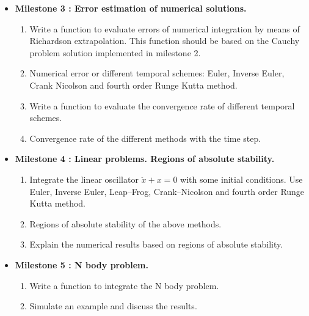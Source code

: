 \documentclass[12pt, a4paper]{article}
\begin{document}
\begin{itemize}
\begin{enumerate}
\end{enumerate} 



\item {\bf Milestone 3 : Error estimation of numerical solutions.} 


\begin{enumerate}

\item Write a function to evaluate errors of numerical integration by means of Richardson 
extrapolation. 
This function should be based on the Cauchy problem solution implemented in milestone 2. 
\item Numerical error or different temporal schemes:  
Euler, Inverse Euler, Crank Nicolson 
and  fourth order Runge Kutta method.  
\item Write a function to evaluate the convergence rate of different temporal schemes. 
\item Convergence rate of the different methods with the time step.   

\end{enumerate} 


\item {\bf Milestone 4 : Linear problems. Regions of absolute stability.}  
  \begin{enumerate}
\item  Integrate the linear oscillator $ \ddot x+ x =0$ with some initial conditions.  
       Use Euler, Inverse Euler, Leap--Frog, Crank--Nicolson and fourth order Runge Kutta
        method.  
\item Regions of absolute stability of the above methods. 
\item Explain the numerical results based on regions of absolute stability.
\end{enumerate}
 

\newpage
\item {\bf Milestone 5 : N  body problem.}    

 \begin{enumerate} 
    
     \item Write a function to integrate the N body problem.  
     \item Simulate an example and discuss the results. 
 \end{enumerate}



\end{itemize}
\end{document}
